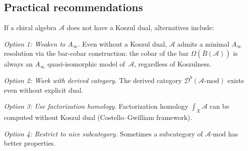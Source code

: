 \subsection{Practical recommendations}

\begin{remark}\label{rem:no-dual-alternatives}
If a chiral algebra $\mathcal{A}$ does not have a Koszul dual, alternatives include:

\emph{Option 1: Weaken to $A_\infty$.}
Even without a Koszul dual, $\mathcal{A}$ admits a minimal $A_\infty$ resolution via the bar-cobar construction: the cobar of the bar $\Omega(\bar{B}(\mathcal{A}))$ is always an $A_\infty$ quasi-isomorphic model of~$\mathcal{A}$, regardless of Koszulness.

\emph{Option 2: Work with derived category.}
The derived category $\mathcal{D}^b(\mathcal{A}\text{-mod})$ exists even without 
explicit dual.

\emph{Option 3: Use factorization homology.}
Factorization homology $\int_X \mathcal{A}$ can be computed without Koszul dual 
(Costello--Gwilliam framework).

\emph{Option 4: Restrict to nice subcategory.}
Sometimes a subcategory of $\mathcal{A}\text{-mod}$ has better properties.
\end{remark}

